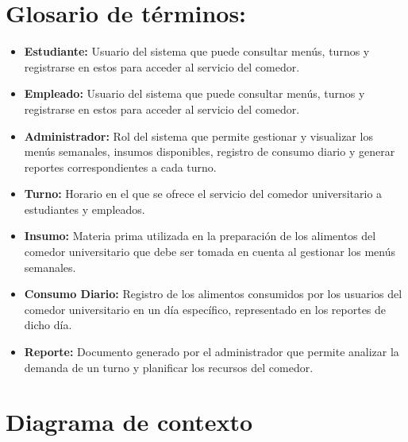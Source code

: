 \documentclass[12pt]{article}
\begin{document}
    \section{Glosario de términos:}
    \medskip
    \begin{itemize}
        \item \textbf{Estudiante:} Usuario del sistema que puede consultar menús, turnos y registrarse en estos para acceder al servicio del comedor.
        \item \textbf{Empleado:} Usuario del sistema que puede consultar menús, turnos y registrarse en estos para acceder al servicio del comedor.
        \item \textbf{Administrador:} Rol del sistema que permite gestionar y visualizar los menús semanales, insumos disponibles, registro de consumo diario y generar reportes correspondientes a cada turno.
        \item \textbf{Turno:} Horario en el que se ofrece el servicio del comedor universitario a estudiantes y empleados.
        \item \textbf{Insumo:} Materia prima utilizada en la preparación de los alimentos del comedor universitario que debe ser tomada en cuenta al gestionar los menús semanales.
        \item \textbf{Consumo Diario:} Registro de los alimentos consumidos por los usuarios del comedor universitario en un día específico, representado en los reportes de dicho día.
        \item \textbf{Reporte:} Documento generado por el administrador que permite analizar la demanda de un turno y planificar los recursos del comedor.
    \end{itemize}
    \newpage

    \section{Diagrama de contexto}
\end{document}
